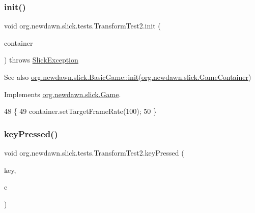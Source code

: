 \subsubsection{\texorpdfstring{init()}{init()}}
{\footnotesize\ttfamily void org.\+newdawn.\+slick.\+tests.\+Transform\+Test2.\+init (\begin{DoxyParamCaption}\item[{\mbox{\hyperlink{classorg_1_1newdawn_1_1slick_1_1_game_container}{Game\+Container}}}]{container }\end{DoxyParamCaption}) throws \mbox{\hyperlink{classorg_1_1newdawn_1_1slick_1_1_slick_exception}{Slick\+Exception}}\hspace{0.3cm}{\ttfamily [inline]}}

\begin{DoxySeeAlso}{See also}
\mbox{\hyperlink{classorg_1_1newdawn_1_1slick_1_1_basic_game_a8af0900217e4d389249f71367b22d114}{org.\+newdawn.\+slick.\+Basic\+Game\+::init}}(\mbox{\hyperlink{classorg_1_1newdawn_1_1slick_1_1_game_container}{org.\+newdawn.\+slick.\+Game\+Container}}) 
\end{DoxySeeAlso}


Implements \mbox{\hyperlink{interfaceorg_1_1newdawn_1_1slick_1_1_game_ad2dd6affab08bb8fdb5fab0815957b7a}{org.\+newdawn.\+slick.\+Game}}.


\begin{DoxyCode}
48                                                                    \{
49       container.setTargetFrameRate(100);
50    \}
\end{DoxyCode}
\mbox{\label{classorg_1_1newdawn_1_1slick_1_1tests_1_1_transform_test2_a1ed06799be5189ef7c6fe102020de383}} 
\subsubsection{\texorpdfstring{key\+Pressed()}{keyPressed()}}
{\footnotesize\ttfamily void org.\+newdawn.\+slick.\+tests.\+Transform\+Test2.\+key\+Pressed (\begin{DoxyParamCaption}\item[{int}]{key,  }\item[{char}]{c }\end{DoxyParamCaption})\hspace{0.3cm}{\ttfamily [inline]}}

